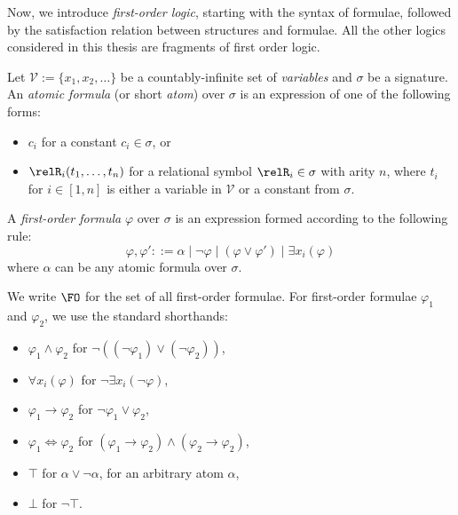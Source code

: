 Now, we introduce \emph{first-order logic}, starting with the syntax of formulae, followed by the satisfaction relation between structures and formulae.
All the other logics considered in this thesis are fragments of first order logic.
\begin{definition}
  Let $\mathcal{V} := \{x_{1}, x_{2}, \ldots\}$ be a countably-infinite set of \emph{variables} and $\sigma$ be a signature.
  An \emph{atomic formula} (or short \emph{atom}) over $\sigma$ is an expression of one of the following forms:
  \begin{itemize}
    \item $c_{i}$ for a constant $c_{i} \in \sigma$, or
    \item $\relR_{i}(t_{1}, \ldots, t_{n})$ for a relational symbol $\relR_{i} \in \sigma$ with arity $n$, where $t_{i}$ for $i \in [1,n]$ is either a variable in $\mathcal{V}$ or a constant from $\sigma$.
  \end{itemize}
  A \emph{first-order formula} $\varphi$ over $\sigma$ is an expression formed according to the following rule:
  \begin{equation*}
    \varphi, \varphi' ::= \alpha
      \mid \neg \varphi
      \mid (\varphi \lor \varphi')
      \mid \exists{x_{i}}(\varphi)
  \end{equation*}
  where $\alpha$ can be any atomic formula over $\sigma$.
\end{definition}
We write $\FO$ for the set of all first-order formulae.
For first-order formulae $\varphi_{1}$ and $\varphi_{2}$, we use the standard shorthands:
\begin{multicols}{2}
  \begin{itemize}
    \item $\varphi_{1} \land \varphi_{2}$ for $\neg ((\neg \varphi_{1}) \lor (\neg \varphi_{2}))$,
    \item $\forall{x_{i}}(\varphi)$ for $\neg\exists{x_{i}}(\neg \varphi)$,
    \item $\varphi_{1} \to \varphi_{2}$ for $\neg \varphi_{1} \lor \varphi_{2}$,
    \item $\varphi_{1} \iff \varphi_{2}$ for $(\varphi_{1} \to \varphi_{2}) \land (\varphi_{2} \to \varphi_{2})$,
    \item $\top$ for $\alpha \lor \neg \alpha$, for an arbitrary atom $\alpha$,
    \item $\bot$ for $\neg \top$.
  \end{itemize}
\end{multicols}
